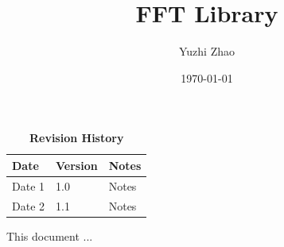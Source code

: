 \documentclass[12pt, titlepage]{article}
\title{FFT Library}
\author{
Yuzhi Zhao\\
}
\date{\today}
\begin{document}
\maketitle

\tableofcontents
\listoftables
\listoffigures

\begin{table}[bp]
\caption{\bf Revision History}
\begin{tabularx}{\textwidth}{p{3cm}p{2cm}X}
\toprule {\bf Date} & {\bf Version} & {\bf Notes}\\
\midrule
Date 1 & 1.0 & Notes\\
Date 2 & 1.1 & Notes\\
\bottomrule
\end{tabularx}
\end{table}

\newpage


This document ...
\end{document}

